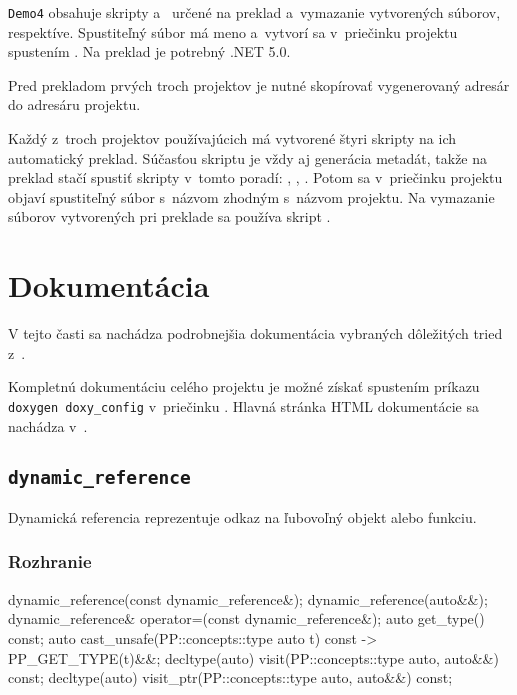 \texttt{Demo4} obsahuje skripty  a~ určené na preklad a~vymazanie vytvorených súborov, respektíve. Spustiteľný súbor má meno  a~vytvorí sa v~priečinku projektu spustením . Na preklad je potrebný \textsf{.NET 5.0}.

Pred prekladom prvých troch projektov je nutné skopírovať vygenerovaný adresár  do adresáru projektu.

Každý z~troch projektov používajúcich \PPreflection{} má vytvorené štyri skripty na ich automatický preklad. Súčasťou skriptu  je vždy aj generácia metadát, takže na preklad stačí spustiť skripty v~tomto poradí: , , . Potom sa v~priečinku projektu objaví spustiteľný súbor s~názvom zhodným s~názvom projektu. Na vymazanie súborov vytvorených pri preklade sa používa skript .

\section{Dokumentácia}

V tejto časti sa nachádza podrobnejšia dokumentácia vybraných dôležitých tried z~\PPreflection{}.

Kompletnú dokumentáciu celého projektu je možné získať spustením príkazu \texttt{doxygen doxy\_config} v~priečinku . Hlavná stránka \textsf{HTML} dokumentácie sa nachádza v~.

\subsection{\texttt{dynamic\_reference}}

Dynamická referencia reprezentuje odkaz na ľubovoľný objekt alebo funkciu.

\subsubsection{Rozhranie}

\begin{code}[fontsize=\footnotesize]
dynamic_reference(const dynamic_reference&);
dynamic_reference(auto&&);
dynamic_reference& operator=(const dynamic_reference&);
auto get_type() const;
auto cast_unsafe(PP::concepts::type auto t) const -> PP_GET_TYPE(t)&&;
decltype(auto) visit(PP::concepts::type auto, auto&&) const;
decltype(auto) visit_ptr(PP::concepts::type auto, auto&&) const;
\end{code}

